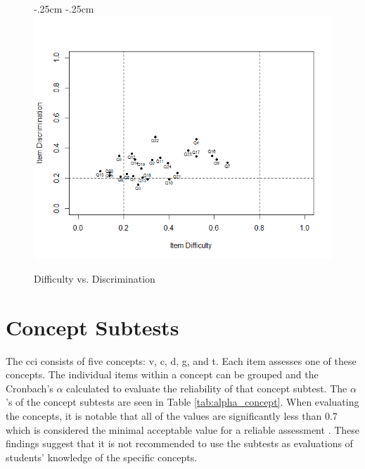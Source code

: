 \begin{figure}[ht]
    \begin{center}
    \advance\leftskip-.25cm
    \advance\rightskip-.25cm
    \includegraphics[scale=.45]{images/diff_v_discrimination_full.png}
    \caption{Difficulty vs. Discrimination}
    \label{fig:dif_disc}
\end{center}
\end{figure}



\FloatBarrier
\section{Concept Subtests}
The \gls{cci} consists of five concepts: \gls{v}, \gls{c}, \gls{d}, \gls{g}, and \gls{t}. Each item assesses one of these concepts. The individual items within a concept can be grouped and the Cronbach's $\alpha$ calculated to evaluate the reliability of that concept subtest. The $\alpha$'s of the concept subtests are seen in Table \ref{tab:alpha_concept}. When evaluating the concepts, it is notable that all of the values are significantly less than 0.7 which is considered the minimal acceptable value for a reliable assessment \cite{panayiotis}. These findings suggest that it is not recommended to use the subtests as evaluations of students' knowledge of the specific concepts. 


